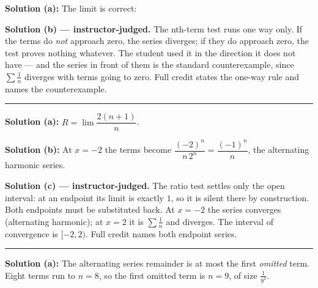 \documentclass[12pt]{article}
\begin{document}



\textbf{Solution (a):} The limit is correct: 

\textbf{Solution (b) --- instructor-judged.} The nth-term test runs one way only. If the terms do \emph{not} approach zero, the series diverges; if they do approach zero, the test proves nothing whatever. The student used it in the direction it does not have --- and the series in front of them is the standard counterexample, since $\sum \frac1n$ diverges with terms going to zero. Full credit states the one-way rule and names the counterexample.

\vspace{0.2cm}\noindent\rule{\linewidth}{0.2pt}\vspace{0.2cm}


\textbf{Solution (a):} $R = \lim \dfrac{2(n+1)}{n}$. 

\textbf{Solution (b):} At $x = -2$ the terms become $\dfrac{(-2)^n}{n\,2^n} = \dfrac{(-1)^n}{n}$, the alternating harmonic series. 

\textbf{Solution (c) --- instructor-judged.} The ratio test settles only the open interval: at an endpoint its limit is exactly $1$, so it is silent there by construction. Both endpoints must be substituted back. At $x = -2$ the series converges (alternating harmonic); at $x = 2$ it is $\sum \frac1n$ and diverges. The interval of convergence is $[-2, 2)$. Full credit names both endpoint series.

\vspace{0.2cm}\noindent\rule{\linewidth}{0.2pt}\vspace{0.2cm}


\textbf{Solution (a):} The alternating series remainder is at most the first \emph{omitted} term. Eight terms run to $n = 8$, so the first omitted term is $n = 9$, of size $\frac{1}{9^2}$. 
\end{document}
